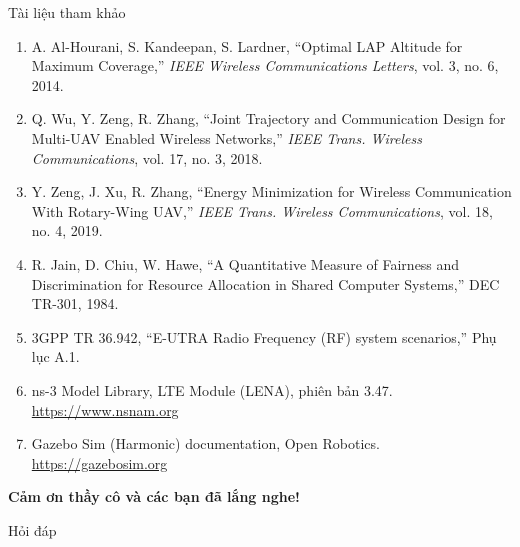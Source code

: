 \documentclass[aspectratio=169,10pt,t]{beamer}
\begin{document}
\begin{frame}{Tài liệu tham khảo}
\scriptsize
\begin{enumerate}
  \setlength{\itemsep}{5pt}
  \item A. Al-Hourani, S. Kandeepan, S. Lardner, ``Optimal LAP Altitude for Maximum Coverage,'' \emph{IEEE Wireless Communications Letters}, vol. 3, no. 6, 2014.
  \item Q. Wu, Y. Zeng, R. Zhang, ``Joint Trajectory and Communication Design for Multi-UAV Enabled Wireless Networks,'' \emph{IEEE Trans. Wireless Communications}, vol. 17, no. 3, 2018.
  \item Y. Zeng, J. Xu, R. Zhang, ``Energy Minimization for Wireless Communication With Rotary-Wing UAV,'' \emph{IEEE Trans. Wireless Communications}, vol. 18, no. 4, 2019.
  \item R. Jain, D. Chiu, W. Hawe, ``A Quantitative Measure of Fairness and Discrimination for Resource Allocation in Shared Computer Systems,'' DEC TR-301, 1984.
  \item 3GPP TR 36.942, ``E-UTRA Radio Frequency (RF) system scenarios,'' Phụ lục A.1.
  \item ns-3 Model Library, LTE Module (LENA), phiên bản 3.47. \url{https://www.nsnam.org}
  \item Gazebo Sim (Harmonic) documentation, Open Robotics. \url{https://gazebosim.org}
\end{enumerate}
\end{frame}

\begin{frame}[plain]
\vfill
\centering
{\fontsize{24}{30}\selectfont\bfseries\color{MainBlue} Cảm ơn thầy cô và các bạn đã lắng nghe!\par}
\vspace{4mm}
{\large\color{black!60} Hỏi đáp\par}
\vfill
\end{frame}
\end{document}
